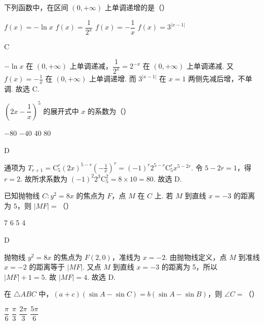 \begin{problem}
下列函数中，在区间 \((0,+\infty)\) 上单调递增的是（\quad）

\choices
    {\(f(x)=-\ln x\)}
    {\(f(x)=\dfrac{1}{2^x}\)}
    {\(f(x)=-\dfrac{1}{x}\)}
    {\(f(x)=3^{|x-1|}\)}
\end{problem}

\begin{answer}
C
\end{answer}

\begin{solution}
\(-\ln x\) 在 \((0,+\infty)\) 上单调递减，\(\dfrac{1}{2^x}=2^{-x}\) 在 \((0,+\infty)\) 上单调递减.
又
\(f(x)=-\frac{1}{x}\)
在 \((0,+\infty)\) 上单调递增.
而 \(3^{|x-1|}\) 在 \(x=1\) 两侧先减后增，不单调.
故选 C.
\end{solution}

\begin{problem}
\(\left(2x-\dfrac{1}{x}\right)^5\) 的展开式中 \(x\) 的系数为（\quad）

\choices
    {\(-80\)}
    {\(-40\)}
    {40}
    {80}
\end{problem}

\begin{answer}
D
\end{answer}

\begin{solution}
通项为
\(T_{r+1}=\mathrm{C}_5^r(2x)^{5-r}\left(-\frac{1}{x}\right)^r =(-1)^r 2^{5-r}\mathrm{C}_5^r x^{5-2r}\).
令 \(5-2r=1\)，得 \(r=2\). 故所求系数为
\((-1)^2 2^3\mathrm{C}_5^2=8\times 10=80\).
故选 D.
\end{solution}

\begin{problem}
已知抛物线 \(C:y^2=8x\) 的焦点为 \(F\)，点 \(M\) 在 \(C\) 上. 若 \(M\) 到直线 \(x=-3\) 的距离为 \(5\)，则 \(|MF|=\)（\quad）

\choices
    {7}
    {6}
    {5}
    {4}
\end{problem}

\begin{answer}
D
\end{answer}

\begin{solution}
抛物线 \(y^2=8x\) 的焦点为 \(F(2,0)\)，准线为 \(x=-2\).
由抛物线定义，点 \(M\) 到准线 \(x=-2\) 的距离等于 \(|MF|\). 又点 \(M\) 到直线 \(x=-3\) 的距离为 5，所以
\(|MF|+1=5\).
故
\(|MF|=4\).
故选 D.
\end{solution}

\begin{problem}
在 \(\triangle ABC\) 中，\((a+c)(\sin A-\sin C)=b(\sin A-\sin B)\)，则 \(\angle C=\)（\quad）

\choices
    {\(\dfrac{\pi}{6}\)}
    {\(\dfrac{\pi}{3}\)}
    {\(\dfrac{2\pi}{3}\)}
    {\(\dfrac{5\pi}{6}\)}
\end{problem}

